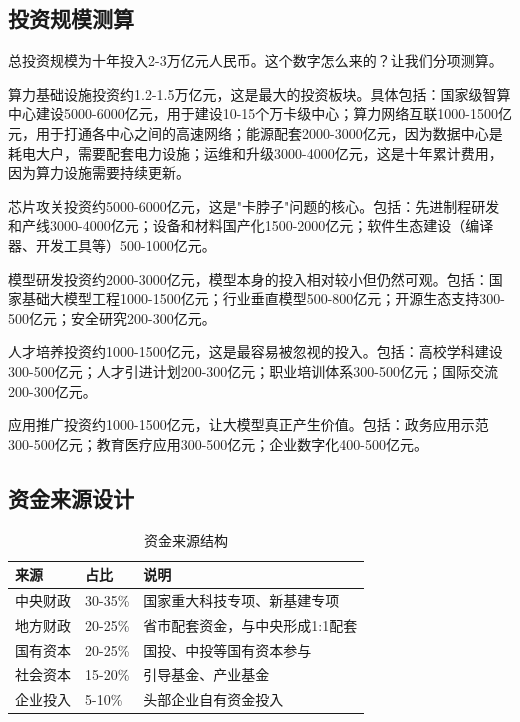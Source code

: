 \subsection{投资规模测算}

总投资规模为十年投入2-3万亿元人民币。这个数字怎么来的？让我们分项测算。

算力基础设施投资约1.2-1.5万亿元，这是最大的投资板块。具体包括：国家级智算中心建设5000-6000亿元，用于建设10-15个万卡级中心；算力网络互联1000-1500亿元，用于打通各中心之间的高速网络；能源配套2000-3000亿元，因为数据中心是耗电大户，需要配套电力设施；运维和升级3000-4000亿元，这是十年累计费用，因为算力设施需要持续更新。

芯片攻关投资约5000-6000亿元，这是"卡脖子"问题的核心。包括：先进制程研发和产线3000-4000亿元；设备和材料国产化1500-2000亿元；软件生态建设（编译器、开发工具等）500-1000亿元。

模型研发投资约2000-3000亿元，模型本身的投入相对较小但仍然可观。包括：国家基础大模型工程1000-1500亿元；行业垂直模型500-800亿元；开源生态支持300-500亿元；安全研究200-300亿元。

人才培养投资约1000-1500亿元，这是最容易被忽视的投入。包括：高校学科建设300-500亿元；人才引进计划200-300亿元；职业培训体系300-500亿元；国际交流200-300亿元。

应用推广投资约1000-1500亿元，让大模型真正产生价值。包括：政务应用示范300-500亿元；教育医疗应用300-500亿元；企业数字化400-500亿元。

\subsection{资金来源设计}

\begin{table}[H]
\centering
\caption{资金来源结构}
\small
\begin{tabular}{p{3cm}p{2cm}p{7cm}}
\toprule
\textbf{来源} & \textbf{占比} & \textbf{说明} \\
\midrule
中央财政 & 30-35\% & 国家重大科技专项、新基建专项 \\
地方财政 & 20-25\% & 省市配套资金，与中央形成1:1配套 \\
国有资本 & 20-25\% & 国投、中投等国有资本参与 \\
社会资本 & 15-20\% & 引导基金、产业基金 \\
企业投入 & 5-10\% & 头部企业自有资金投入 \\
\bottomrule
\end{tabular}
\end{table}

